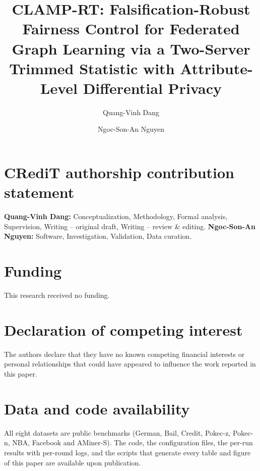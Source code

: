 \documentclass[preprint,12pt]{elsarticle}
\theoremstyle{plain}
\theoremstyle{definition}
\theoremstyle{remark}
\begin{document}
\begin{frontmatter}

\title{CLAMP-RT: Falsification-Robust Fairness Control for Federated Graph Learning via a Two-Server Trimmed Statistic with Attribute-Level Differential Privacy}

\author[inst1]{Quang-Vinh Dang}

\author[inst2]{Ngoc-Son-An Nguyen}





\end{frontmatter}











\section*{CRediT authorship contribution statement}
\textbf{Quang-Vinh Dang:} Conceptualization, Methodology, Formal analysis, Supervision, Writing -- original draft, Writing -- review \& editing.
\textbf{Ngoc-Son-An Nguyen:} Software, Investigation, Validation, Data curation.

\section*{Funding}
This research received no funding.

\section*{Declaration of competing interest}
The authors declare that they have no known competing financial interests or personal relationships that could have appeared to influence the work reported in this paper.

\section*{Data and code availability}
All eight datasets are public benchmarks (German, Bail, Credit, Pokec-z, Pokec-n, NBA, Facebook and AMiner-S). The code, the configuration files, the per-run results with per-round logs, and the scripts that generate every table and figure of this paper are available upon publication.



\end{document}
